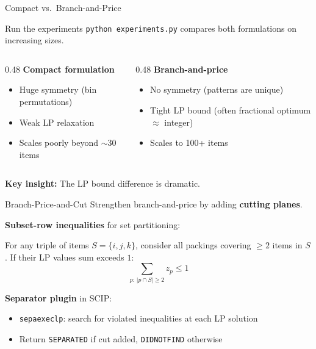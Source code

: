 \documentclass[aspectratio=169]{beamer}
\begin{document}
\begin{frame}{Compact vs.\ Branch-and-Price}
\begin{block}{Run the experiments}
\texttt{python experiments.py} compares both formulations on increasing sizes.
\end{block}

\medskip
\begin{columns}[T]
\begin{column}{0.48\textwidth}
\textbf{Compact formulation}
\begin{itemize}
  \item Huge symmetry (bin permutations)
  \item Weak LP relaxation
  \item Scales poorly beyond $\sim$30 items
\end{itemize}
\end{column}
\begin{column}{0.48\textwidth}
\textbf{Branch-and-price}
\begin{itemize}
  \item No symmetry (patterns are unique)
  \item Tight LP bound (often fractional optimum $\approx$ integer)
  \item Scales to 100+ items
\end{itemize}
\end{column}
\end{columns}

\bigskip
\textbf{Key insight:} The LP bound difference is dramatic.
\end{frame}

\begin{frame}{Branch-Price-and-Cut}
Strengthen branch-and-price by adding \textbf{cutting planes}.

\medskip
\textbf{Subset-row inequalities} for set partitioning:

For any triple of items $S = \{i, j, k\}$, consider all packings covering
$\ge 2$ items in $S$. If their LP values sum exceeds $1$:
\[
  \sum_{p:\, |p \cap S| \ge 2} z_p \le 1
\]

\medskip
\textbf{Separator plugin} in SCIP:
\begin{itemize}
  \item \texttt{sepaexeclp}: search for violated inequalities at each LP solution
  \item Return \texttt{SEPARATED} if cut added, \texttt{DIDNOTFIND} otherwise
\end{itemize}
\end{frame}
\end{document}
